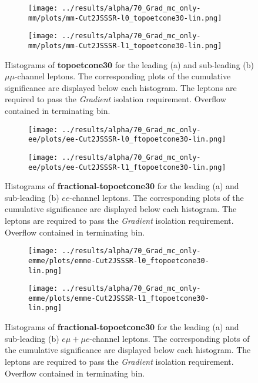 \begin{figure}
\centering
\begin{subfigure}{.65\textwidth}
  \centering
  \texttt{[image: ../results/alpha/70\_Grad\_mc\_only-mm/plots/mm-Cut2JSSSR-l0\_topoetcone30-lin.png]}
  \caption{}
  \label{mm_leading_topoetcone}
\end{subfigure}
\begin{subfigure}{.65\textwidth}
 \centering
  \texttt{[image: ../results/alpha/70\_Grad\_mc\_only-mm/plots/mm-Cut2JSSSR-l1\_topoetcone30-lin.png]}
  \caption{}
  \label{mm_subleading_topoetcone}
\end{subfigure}
\caption{Histograms of \textbf{topoetcone30} for the leading (a) and sub-leading (b) $\mu\mu$-channel leptons. The corresponding plots of the cumulative significance are displayed below each histogram. The leptons are required to pass the \textit{Gradient} isolation requirement. Overflow contained in terminating bin.}
\label{topoetcone30_isoplots_wGrad_mm}
\end{figure}
\begin{figure}
\centering
\begin{subfigure}{.65\textwidth}
  \centering
  \texttt{[image: ../results/alpha/70\_Grad\_mc\_only-ee/plots/ee-Cut2JSSSR-l0\_ftopoetcone30-lin.png]}
  \caption{}
  \label{ee_leading_topoetcone}
\end{subfigure}
\begin{subfigure}{.65\textwidth}
 \centering
  \texttt{[image: ../results/alpha/70\_Grad\_mc\_only-ee/plots/ee-Cut2JSSSR-l1\_ftopoetcone30-lin.png]}
  \caption{}
  \label{ee_subleading_topoetcone}
\end{subfigure}
\caption{Histograms of \textbf{fractional-topoetcone30} for the leading (a) and sub-leading (b) $ee$-channel leptons. The corresponding plots of the cumulative significance are displayed below each histogram. The leptons are required to pass the \textit{Gradient} isolation requirement. Overflow contained in terminating bin.}
\label{ftopoetcone30_isoplots_wGrad_ee}
\end{figure}
\begin{figure}
\centering
\begin{subfigure}{.65\textwidth}
  \centering
  \texttt{[image: ../results/alpha/70\_Grad\_mc\_only-emme/plots/emme-Cut2JSSSR-l0\_ftopoetcone30-lin.png]}
  \caption{}
  \label{emme_leading_topoetcone}
\end{subfigure}
\begin{subfigure}{.65\textwidth}
 \centering
  \texttt{[image: ../results/alpha/70\_Grad\_mc\_only-emme/plots/emme-Cut2JSSSR-l1\_ftopoetcone30-lin.png]}
  \caption{}
  \label{emme_subleading_topoetcone}
\end{subfigure}
\caption{Histograms of \textbf{fractional-topoetcone30} for the leading (a) and sub-leading (b) $e\mu+\mu e$-channel leptons. The corresponding plots of the cumulative significance are displayed below each histogram. The leptons are required to pass the \textit{Gradient} isolation requirement. Overflow contained in terminating bin.}
\label{ftopoetcone30_isoplots_wGrad_emme}
\end{figure}
